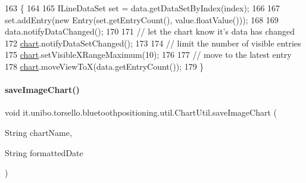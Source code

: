 \begin{DoxyCode}
163                                                                    \{
164 
165         ILineDataSet \textcolor{keyword}{set} = data.getDataSetByIndex(index);
166 
167         \textcolor{keyword}{set}.addEntry(\textcolor{keyword}{new} Entry(\textcolor{keyword}{set}.getEntryCount(), value.floatValue()));
168 
169         data.notifyDataChanged();
170 
171         \textcolor{comment}{// let the chart know it's data has changed}
172         \hyperlink{classit_1_1unibo_1_1torsello_1_1bluetoothpositioning_1_1util_1_1ChartUtil_a6c34176fdfb85bac1d3aa1529b49ad5f_a6c34176fdfb85bac1d3aa1529b49ad5f}{chart}.notifyDataSetChanged();
173 
174         \textcolor{comment}{// limit the number of visible entries}
175         \hyperlink{classit_1_1unibo_1_1torsello_1_1bluetoothpositioning_1_1util_1_1ChartUtil_a6c34176fdfb85bac1d3aa1529b49ad5f_a6c34176fdfb85bac1d3aa1529b49ad5f}{chart}.setVisibleXRangeMaximum(10);
176 
177         \textcolor{comment}{// move to the latest entry}
178         \hyperlink{classit_1_1unibo_1_1torsello_1_1bluetoothpositioning_1_1util_1_1ChartUtil_a6c34176fdfb85bac1d3aa1529b49ad5f_a6c34176fdfb85bac1d3aa1529b49ad5f}{chart}.moveViewToX(data.getEntryCount());
179     \}
\end{DoxyCode}
\hypertarget{classit_1_1unibo_1_1torsello_1_1bluetoothpositioning_1_1util_1_1ChartUtil_afdbdcf15b073da5b03613dbccc7681a9_afdbdcf15b073da5b03613dbccc7681a9}{}\label{classit_1_1unibo_1_1torsello_1_1bluetoothpositioning_1_1util_1_1ChartUtil_afdbdcf15b073da5b03613dbccc7681a9_afdbdcf15b073da5b03613dbccc7681a9} 
\paragraph{\texorpdfstring{save\+Image\+Chart()}{saveImageChart()}}
{\footnotesize\ttfamily void it.\+unibo.\+torsello.\+bluetoothpositioning.\+util.\+Chart\+Util.\+save\+Image\+Chart (\begin{DoxyParamCaption}\item[{String}]{chart\+Name,  }\item[{String}]{formatted\+Date }\end{DoxyParamCaption})}


